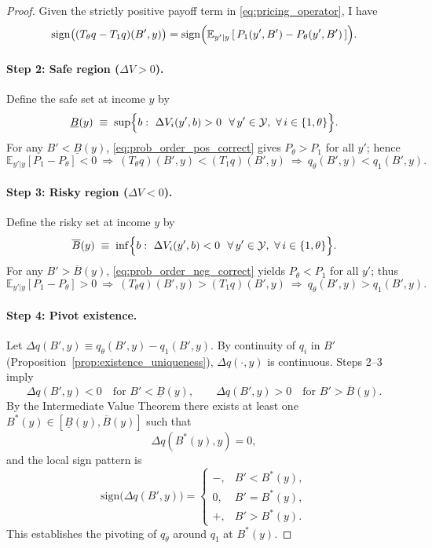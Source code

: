 \documentclass[12pt]{article}
\theoremstyle{plain}
\newcommand{\E}{\mathbb{E}}
\newcommand{\Y}{\mathcal{Y}}
\begin{document}
\begin{proof}
	Given the strictly positive payoff term in \eqref{eq:pricing_operator}, I have
	\begin{equation}
		\mathrm{sign}\bigl((T_\theta q-T_1 q)(B',y)\bigr)
		= \mathrm{sign}\Bigl(\E_{y'|y}\,[\,P_1(y',B')-P_\theta(y',B')\,]\Bigr).
		\label{eq:operator_sign_correct}
	\end{equation}

	\paragraph{Step 2: Safe region (\(\Delta V>0\)).}
	Define the safe set at income \(y\) by
	\[
		\underline{B}(y)\;\equiv\;\sup\Bigl\{b:\ \Delta V_i(y',b)>0\ \ \forall\,y'\in\Y,\ \forall\,i\in\{1,\theta\}\Bigr\}.
	\]
	For any \(B'<\underline{B}(y)\), \eqref{eq:prob_order_pos_correct} gives
	\(P_\theta>P_1\) for all $y'$; hence
	\[
		\E_{y'|y}[P_1-P_\theta]<0
		\ \Rightarrow\
		(T_\theta q)(B',y)<(T_1 q)(B',y)
		\ \Rightarrow\
		q_\theta(B',y)<q_1(B',y).
	\]

	\paragraph{Step 3: Risky region (\(\Delta V<0\)).}
	Define the risky set at income \(y\) by
	\[
		\overline{B}(y)\;\equiv\;\inf\Bigl\{b:\ \Delta V_i(y',b)<0\ \ \forall\,y'\in\Y,\ \forall\,i\in\{1,\theta\}\Bigr\}.
	\]
	For any \(B'>\overline{B}(y)\), \eqref{eq:prob_order_neg_correct} yields
	\(P_\theta<P_1\) for all $y'$; thus
	\[
		\E_{y'|y}[P_1-P_\theta]>0
		\ \Rightarrow\
		(T_\theta q)(B',y)>(T_1 q)(B',y)
		\ \Rightarrow\
		q_\theta(B',y)>q_1(B',y).
	\]

	\paragraph{Step 4: Pivot existence.}
	Let $\Delta q(B',y)\equiv q_\theta(B',y)-q_1(B',y)$. By continuity of $q_i$ in
	$B'$ (Proposition~\ref{prop:existence_uniqueness}), $\Delta q(\cdot,y)$ is
	continuous. Steps 2–3 imply
	\[
		\Delta q(B',y)<0\quad \text{for } B'<\underline{B}(y),
		\qquad
		\Delta q(B',y)>0\quad \text{for } B'>\overline{B}(y).
	\]
	By the Intermediate Value Theorem there exists at least one
	$B^*(y)\in[\underline{B}(y),\overline{B}(y)]$ such that
	\[
		\Delta q(B^*(y),y)=0,
	\]
	and the local sign pattern is
	\[
		\mathrm{sign}\bigl(\Delta q(B',y)\bigr)
		=
		\begin{cases}
			-\!, & B'<B^*(y), \\
			0,   & B'=B^*(y), \\
			+\!, & B'>B^*(y).
		\end{cases}
	\]
	This establishes the pivoting of $q_\theta$ around $q_1$ at $B^*(y)$.
\end{proof}
\end{document}
